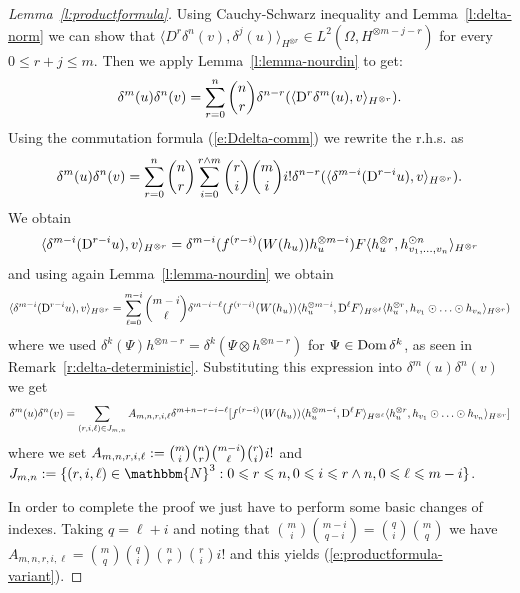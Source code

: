 \begin{appendices}
\begin{proof}[Lemma~\ref{l:productformula}]
  Using Cauchy-Schwarz inequality and Lemma~\ref{l:delta-norm} we can show
  that $\langle D^r \delta^n (v), \delta^j (u) \rangle_{H^{\otimes r}} \in L^2
  (\Omega, H^{\otimes m - j - r})$ for every $0 \leqslant r + j \leqslant m$.
  Then we apply Lemma~\ref{l:lemma-nourdin} to get:
  \[ \delta^m (u) \delta^n (v) = \sum_{r = 0}^n \binom{n}{r} \delta^{n - r}
     (\langle \mathrm{D}^r \delta^m (u), v \rangle_{H^{\otimes r}}) . \]
  Using the commutation formula (\ref{e:Ddelta-comm}) we rewrite the r.h.s. as
  \[ \delta^m (u) \delta^n (v) = \sum_{r = 0}^n \binom{n}{r} \sum_{i = 0}^{r
     \wedge m} \binom{r}{i} \binom{m}{i} i! \delta^{n - r} (\langle \delta^{m
     - i} (\mathrm{D}^{r - i} u), v \rangle_{H^{\otimes r}}) . \]
  We obtain
  \[ \langle \delta^{m - i} (\mathrm{D}^{r - i} u), v \rangle_{H^{\otimes r}} =
     \delta^{m - i} (f^{(r - i)} (W (h_u)) h_u^{\otimes m - i}) F \langle
     h^{\otimes r}_u, h^{\odot n}_{v_1, \ldots, v_n} \rangle_{H^{\otimes r}}
  \]
  and using again Lemma~\ref{l:lemma-nourdin} we obtain
  \[ \langle \delta^{m - i} (\mathrm{D}^{r - i} u), v \rangle_{H^{\otimes r}} =
     \sum_{\ell = 0}^{m - i} \binom{m - i}{\ell} \delta^{m - i - \ell} (f^{(r
     - i)} (W (h_u)) \langle h_u^{\otimes m - i}, \mathrm{D}^{\ell} F
     \rangle_{H^{\otimes \ell}} \langle h^{\otimes r}_u, h_{v_1} \odot \ldots
     \odot h_{v_n} \rangle_{H^{\otimes r}}) \]
  where we used $\delta^k (\Psi) h^{\otimes n - r} = \delta^k (\Psi \otimes
  h^{\otimes n - r})$ for $\Psi \in \operatorname{Dom} \delta^k$, as seen in
  Remark~\ref{r:delta-deterministic}. Substituting this expression into
  $\delta^m (u) \delta^n (v)$ we get
  \[ \delta^m (u) \delta^n (v) = \sum_{(r, i, \ell) \in J_{m, n}} A_{m, n, r,
     i, \ell} \delta^{m + n - r - i - \ell} [f^{(r - i)} (W (h_u)) \langle
     h_u^{\otimes m - i}, \mathrm{D}^{\ell} F \rangle_{H^{\otimes \ell}} \langle
     h^{\otimes r}_u, h_{v_1} \odot \ldots \odot h_{v_n} \rangle_{H^{\otimes
     r}}] \]
  where we set $A_{m, n, r, i, \ell} := \binom{m}{i} \binom{n}{r}
  \binom{m - i}{\ell} \binom{r}{i} i!$ and $J_{m, n} \assign \{ (r, i, \ell)
  \in \mathbbm{N}^3 : 0 \leqslant r \leqslant n, 0 \leqslant i \leqslant r
  \wedge n, 0 \leqslant \ell \leqslant m - i \}$.
  
  In order to complete the proof we just have to perform some basic changes
  of indexes. Taking $q = \ell + i$ and noting that $\binom{m}{i} \binom{m -
  i}{q - i} = \binom{q}{i} \binom{m}{q}$ we have $A_{m, n, r, i, \ell} =
  \binom{m}{q} \binom{q}{i} \binom{n}{r} \binom{r}{i} i!$ and this yields
  (\ref{e:productformula-variant}).
  

\end{proof}
\end{appendices}
